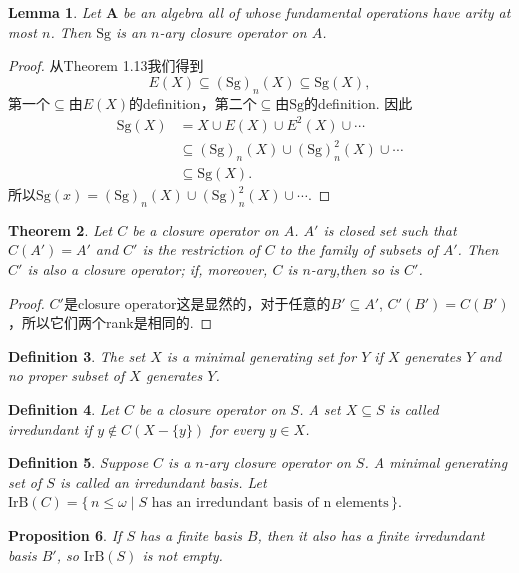 \documentclass{article}
\newtheorem{theorem}{Theorem}[section]
\newtheorem{lemma}[theorem]{Lemma}
\newtheorem{proposition}[theorem]{Proposition}
\newtheorem{definition}[theorem]{Definition}
\newcommand\Set[2]{\{\,#1\mid#2\,\}} %
\newcommand\SET[2]{\Set{#1}{\text{#2}}} %
\newcommand\Sg{\text{Sg}}
\newcommand\algebra{\mathbf{A}}
\begin{document}
\begin{lemma}
\rm Let $\algebra$ be an algebra all of whose fundamental operations have arity at most $n$. Then $\Sg$ is an $n$-ary closure operator on $A$.
\end{lemma}

\begin{proof}
从Theorem 1.13我们得到
$$
 E(X) \subseteq (\Sg)_n(X) \subseteq \Sg(X),
$$
第一个$\subseteq$由$E(X)$的definition，第二个$\subseteq$由$\Sg$的definition. 因此
$$
\begin{aligned}
\Sg(X) &= X \cup E(X) \cup E^2(X) \cup \cdots \\
 &\subseteq (\Sg)_n(X) \cup (\Sg)_n^2(X) \cup \cdots \\
 &\subseteq \Sg(X).
\end{aligned}
$$
所以$\Sg(x) = (\Sg)_n(X) \cup (\Sg)_n^2(X) \cup \cdots . $
\end{proof}

\begin{theorem}
\rm Let $C$ be a closure operator on $A$. $A'$ is closed set such that $C(A') = A'$ and $C'$ is the restriction of $C$ to the family of subsets of $A'$. Then $C'$ is also a closure operator; if, moreover, $C$ is $n$-ary,then so is $C'$. 
\end{theorem}

\begin{proof}
$C'$是closure operator这是显然的，对于任意的$B' \subseteq A'$, $C'(B') = C(B')$，所以它们两个rank是相同的. 
\end{proof}


\begin{definition}
\rm The set $X$ is a {\color{red} minimal generating set} for $Y$ if $X$ generates $Y$ and no proper subset of $X$ generates $Y$.
\end{definition}

\begin{definition}
\rm Let $C$ be a closure operator on $S$. A set $X \subseteq S$ is called {\color{red} irredundant} if $y \notin C(X-\{y\})$ for every $y \in X$. 
\end{definition}

\begin{definition}
\rm Suppose $C$ is a $n$-ary closure operator on $S$. A minimal generating set of $S$ is called an {\color{red} irredundant basis}. Let $\text{IrB}(C) = \SET{n \leq \omega}{$S$ has an irredundant basis of n elements}.$
\end{definition}

\begin{proposition}
\rm If $S$ has a finite basis $B$, then it also has a finite irredundant basis $B'$, so $\text{IrB}(S)$ is not empty. 
\end{proposition}
\end{document}
